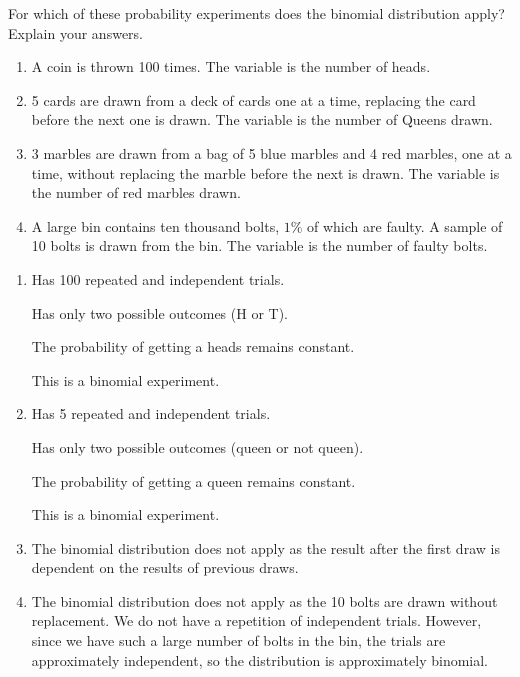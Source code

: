 \documentclass[11pt,a4paper]{book}
\begin{document}
\begin{example}

For which of these probability experiments does the binomial distribution apply? Explain your answers.

\begin{enumerate}[label=(\alph*)]

\item A coin is thrown 100 times. The variable is the number of heads.

\item 5 cards are drawn from a deck of cards one at a time, replacing
the card before the next one is drawn. The variable is the number
of Queens drawn.

\item 3 marbles are drawn from a bag of 5 blue marbles and 4 red
marbles, one at a time, without replacing the marble before the next
is drawn. The variable is the number of red marbles drawn.

\item A large bin contains ten thousand bolts, $1\%$ of which are faulty. A sample of 10 bolts is drawn from the bin. The variable is the number of faulty bolts.

\end{enumerate}

\Solution

\begin{enumerate}[label=(\alph*)]

\item  Has 100 repeated and independent trials. \checkmark

Has only two possible outcomes (H or T). \checkmark

The probability of getting a heads remains constant. \checkmark

This is a binomial experiment.

\item  Has 5 repeated and independent trials. \checkmark

Has only two possible outcomes (queen or not queen). \checkmark

The probability of getting a queen remains constant. \checkmark

This is a binomial experiment.

\item  The binomial distribution does not apply as the result after
the first draw is dependent on the results of previous draws.

\item  The binomial distribution does not apply as the 10 bolts are
drawn without replacement. We do not have a repetition of independent
trials. However, since we have such a large number of bolts in the bin, the trials are approximately independent, so the distribution is approximately binomial.

\end{enumerate}

\end{example}
\end{document}
